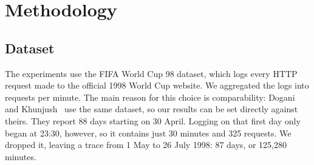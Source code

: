 \chapter{Methodology}\label{chap:methodology}


\section{Dataset}
The experiments use the FIFA World Cup 98 dataset, which logs every HTTP request made to the official 1998 World Cup website. We aggregated the logs into requests per minute. The main reason for this choice is comparability: Dogani and Khunjush~\cite{dogani2024} use the same dataset, so our results can be set directly against theirs. They report 88 days starting on 30 April. Logging on that first day only began at 23:30, however, so it contains just 30 minutes and 325 requests. We dropped it, leaving a trace from 1 May to 26 July 1998: 87 days, or 125,280 minutes.
